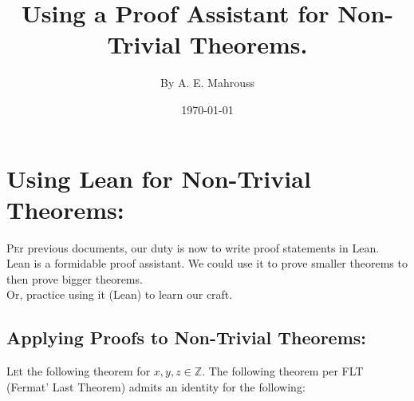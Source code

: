\documentclass[10pt]{article}
\title{%
	\vspace{-1.5em}%
	\large\textbf{Using a Proof Assistant for Non-Trivial Theorems.}%
}
\author{By A. E. Mahrouss}
\date{\today}
\theoremstyle{plain}
\theoremstyle{definition}
\theoremstyle{remark}
\begin{document}
	
	\maketitle
	\tableofcontents
	\newpage
	
	\section{Using Lean for Non-Trivial Theorems:}
	
	\lettrine[lines=2, lhang=0.1, loversize=0.2]{P}er previous documents, our duty is now to write proof statements in Lean.\\
	Lean is a formidable proof assistant. We could use it to prove smaller theorems to then prove bigger theorems.\\Or, practice using it (Lean) to learn our craft.

	\subsection{Applying Proofs to Non-Trivial Theorems:}

	\lettrine[lines=1, lhang=0.1, loversize=0.2]{L}et the following theorem for $x, y, z \in \mathbb{Z}$. The following theorem per FLT (Fermat' Last Theorem) admits an identity for the following:
	
\end{document}
